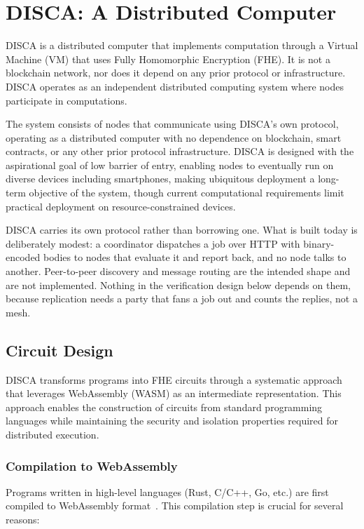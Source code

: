 \documentclass[12pt,a4paper]{article}
\begin{document}
\section{DISCA: A Distributed Computer}

DISCA is a distributed computer that implements computation through a Virtual Machine (VM) that uses Fully Homomorphic Encryption (FHE).
It is not a blockchain network, nor does it depend on any prior protocol or infrastructure.
DISCA operates as an independent distributed computing system where nodes participate in computations.

The system consists of nodes that communicate using DISCA's own protocol, operating as a distributed computer with no dependence on blockchain, smart contracts, or any other prior protocol infrastructure.
DISCA is designed with the aspirational goal of low barrier of entry, enabling nodes to eventually run on diverse devices including smartphones, making ubiquitous deployment a long-term objective of the system, though current computational requirements limit practical deployment on resource-constrained devices.

DISCA carries its own protocol rather than borrowing one.
What is built today is deliberately modest: a coordinator dispatches a job over HTTP with binary-encoded bodies to nodes that evaluate it and report back, and no node talks to another.
Peer-to-peer discovery and message routing are the intended shape and are not implemented.
Nothing in the verification design below depends on them, because replication needs a party that fans a job out and counts the replies, not a mesh.

\subsection{Circuit Design}

DISCA transforms programs into FHE circuits through a systematic approach that leverages WebAssembly (WASM) as an intermediate representation.
This approach enables the construction of circuits from standard programming languages while maintaining the security and isolation properties required for distributed execution.

\subsubsection{Compilation to WebAssembly}

Programs written in high-level languages (Rust, C/C++, Go, etc.) are first compiled to WebAssembly format~\cite{wasm_spec}.
This compilation step is crucial for several reasons:
\end{document}
